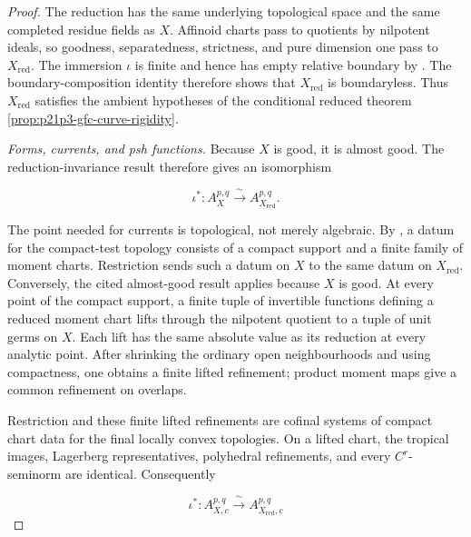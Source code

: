 \begin{proof}
The reduction has the same underlying topological space and the same
completed residue fields as \(X\).  Affinoid charts pass to quotients by
nilpotent ideals, so goodness, separatedness, strictness, and pure
dimension one pass to \(X_{\mathrm{red}}\).  The immersion \(\iota\) is
finite and hence has empty relative boundary by
\cite[\S11.4.4]{CLD25}.  The boundary-composition identity
\cite[(11.4.1.3)]{CLD25} therefore shows that
\(X_{\mathrm{red}}\) is boundaryless.  Thus \(X_{\mathrm{red}}\)
satisfies the ambient hypotheses of the conditional reduced theorem
\cref{prop:p21p3-gfc-curve-rigidity}.

\smallskip
\emph{Forms, currents, and psh functions.}
Because \(X\) is good, it is almost good.  The reduction-invariance result
\cite[Proposition~15.1.3(b) and the following form variant]{CLD25}
therefore gives an isomorphism

\begin{equation}
\label{eq:p21p3-gfnr-form-isomorphism}
       \iota^*:A_X^{p,q}\xrightarrow{\ \sim\ }
                       A_{X_{\mathrm{red}}}^{p,q}.
\end{equation}

The point needed for currents is topological, not merely algebraic.  By
\cite[\S\S~6.4.1 and 7.1.1--7.1.2]{CLD25}, a datum for the compact-test
topology consists of a compact support and a finite family of moment charts.
Restriction sends such a datum on \(X\)
to the same datum on \(X_{\mathrm{red}}\).  Conversely, the cited
almost-good result applies because \(X\) is good.  At every point of the
compact support, a finite tuple of invertible functions defining a reduced
moment chart lifts through the nilpotent quotient to a tuple of unit germs
on \(X\).  Each lift has the same absolute value as its reduction at every
analytic point.  After shrinking the ordinary open neighbourhoods and
using compactness, one obtains a finite lifted refinement; product moment
maps give a common refinement on overlaps.

Restriction and these finite lifted refinements are cofinal systems of
compact chart data for the final locally convex topologies.  On a lifted
chart, the tropical images, Lagerberg representatives, polyhedral
refinements, and every \(C^r\)-seminorm are identical.  Consequently

\begin{equation}
\label{eq:p21p3-gfnr-test-homeomorphism}
 \iota^*:A^{p,q}_{X,c}\xrightarrow{\ \sim\ }
                         A^{p,q}_{X_{\mathrm{red}},c}
\end{equation}


\end{proof}
